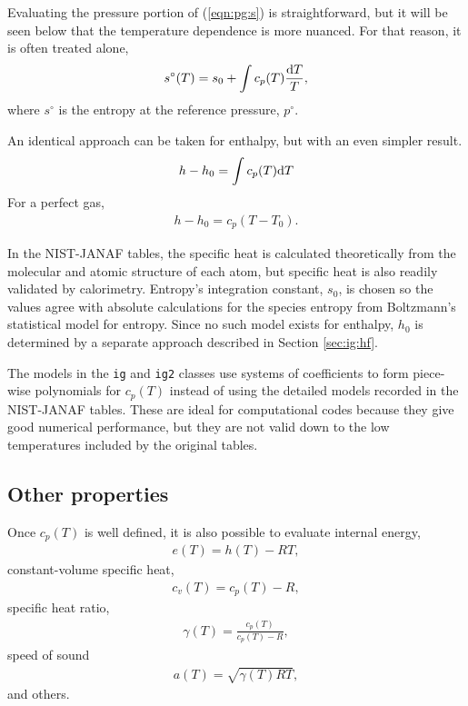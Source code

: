 Evaluating the pressure portion of (\ref{eqn:pg:s}) is straightforward, but it will be seen below that the temperature dependence is more nuanced.  For that reason, it is often treated alone,
\begin{align}
s^\circ(T) = s_0 + \int c_p(T) \frac{\mathrm{d} T}{T},
\end{align}
where $s^\circ$ is the entropy at the reference pressure, $p^\circ$.

An identical approach can be taken for enthalpy, but with an even simpler result.  
\begin{align}
h - h_0 = \int c_p(T) \mathrm{d} T \label{eqn:ig:h}
\end{align}
For a perfect gas,
\begin{align}
h - h_0 = c_p \left(T - T_0\right). \label{eqn:pg:h}
\end{align}

In the NIST-JANAF tables, the specific heat is calculated theoretically from the molecular and atomic structure of each atom, but specific heat is also readily validated by calorimetry.  Entropy's integration constant, $s_0$, is chosen so the values agree with absolute calculations for the species entropy from Boltzmann's statistical model for entropy.  Since no such model exists for enthalpy, $h_0$ is determined by a separate approach described in Section \ref{sec:ig:hf}.

The models in the \texttt{ig} and \texttt{ig2} classes use systems of coefficients to form piece-wise polynomials for $c_p(T)$ instead of using the detailed models recorded in the NIST-JANAF tables.  These are ideal for computational codes because they give good numerical performance, but they are not valid down to the low temperatures included by the original tables.

\subsection{Other properties}

Once $c_p(T)$ is well defined, it is also possible to evaluate internal energy,
\begin{align}
e(T) = h(T) - RT,\label{eqn:ig:e}
\end{align}
constant-volume specific heat,
\begin{align}
c_v(T) = c_p(T) - R,\label{eqn:ig:cv}
\end{align}
specific heat ratio,
\begin{align}
\gamma(T) = \frac{c_p(T)}{c_p(T) - R},\label{eqn:ig:cp}
\end{align}
speed of sound
\begin{align}
a(T) = \sqrt{\gamma(T) R T},\label{eqn:ig:a}
\end{align}
and others.

